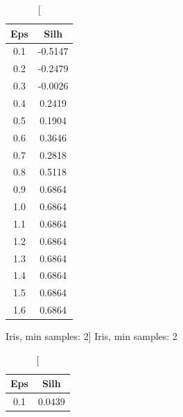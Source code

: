 \documentclass{classrep}
\begin{document}
{{{                \begin{table}[!htbp]
                    \begin{minipage}{.24\textwidth}
                        \centering
                        \begin{tabular}{|c|c|}
                            \hline
                            Eps & Silh \\ \hline
                            0.1 & -0.5147 \\ \hline
                            0.2 & -0.2479 \\ \hline
                            0.3 & -0.0026 \\ \hline
                            0.4 & 0.2419 \\ \hline
                            0.5 & 0.1904 \\ \hline
                            0.6 & 0.3646 \\ \hline
                            0.7 & 0.2818 \\ \hline
                            0.8 & 0.5118 \\ \hline
                            0.9 & 0.6864 \\ \hline
                            1.0 & 0.6864 \\ \hline
                            1.1 & 0.6864 \\ \hline
                            1.2 & 0.6864 \\ \hline
                            1.3 & 0.6864 \\ \hline
                            1.4 & 0.6864 \\ \hline
                            1.5 & 0.6864 \\ \hline
                            1.6 & 0.6864 \\ \hline
                        \end{tabular}
                        \caption
                        [Iris, min samples: 2]
                        {Iris, min samples: 2}
                        \label{db_scan_table_Iris_eucl_min_sample2}
                    \end{minipage}
                    \hfill
                    \begin{minipage}{.24\textwidth}
                        \centering
                        \begin{tabular}{|c|c|}
                            \hline
                            Eps & Silh \\ \hline
                            0.1 & 0.0439 \\ \hline

\end{tabular}
\end{minipage}
\end{table}}}}
\end{document}
